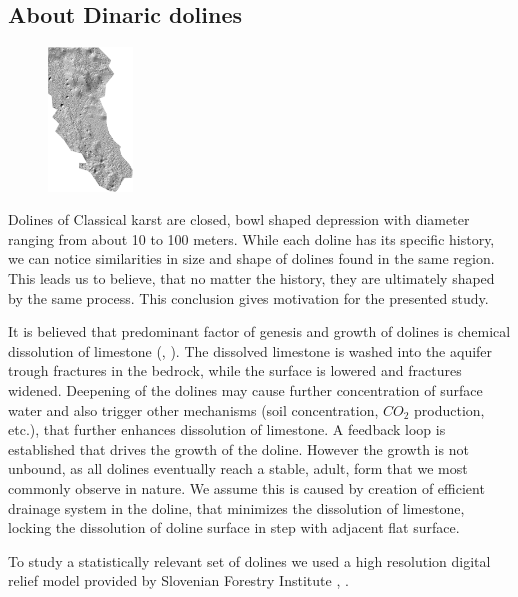\documentclass[a0,portrait]{a0poster}
\begin{document}
\begin{multicols}{2}
\section*{About Dinaric dolines}
\begin{figure}
\begin{center}
  \includegraphics[width=0.2\textwidth]{menisija-relief.png}
  \label{fig:menisija}
\end{center}
\end{figure}
Dolines of Classical karst are closed, bowl shaped depression with diameter ranging from about 10 to 100 meters. While each doline has its specific history, we can notice similarities in size and shape of dolines found in the same region. This leads us to believe, that no matter the history, they are ultimately shaped by the same process. This conclusion gives motivation for the presented study.

It is believed that predominant factor of genesis and growth of dolines is chemical dissolution of limestone (\cite{ford2007karst}, \cite{Zambo1997}). The dissolved limestone is washed into the aquifer trough fractures in the bedrock, while the surface is lowered and fractures widened. Deepening of the dolines may cause further concentration of surface water and also trigger other mechanisms (soil concentration, $CO_2$ production, etc.), that further enhances dissolution of limestone. A feedback loop is established that drives the growth of the doline. However the growth is not unbound, as all dolines eventually reach a stable, adult, form that we most commonly observe in nature. We assume this is caused by creation of efficient drainage system in the doline, that minimizes the dissolution of limestone, locking the dissolution of doline surface in step with adjacent flat surface.

To study a statistically relevant set of dolines we used a high resolution digital relief model provided by Slovenian Forestry Institute \cite{LAK}, \cite{Kobler20079}.


\end{multicols}
\end{document}
